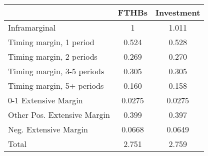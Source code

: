 \begin{tabular}{l*{2}{c}}
\hline\hline
            &       FTHBs&  Investment\\
\hline
Inframarginal&           1&       1.011\\
Timing margin, 1 period&       0.524&       0.528\\
Timing margin, 2 periods&       0.269&       0.270\\
Timing margin, 3-5 periods&       0.305&       0.305\\
Timing margin, 5+ periods&       0.160&       0.158\\
0-1 Extensive Margin&      0.0275&      0.0275\\
Other Pos. Extensive Margin&       0.399&       0.397\\
Neg. Extensive Margin&      0.0668&      0.0649\\
Total       &       2.751&       2.759\\
\hline\hline
\end{tabular}
